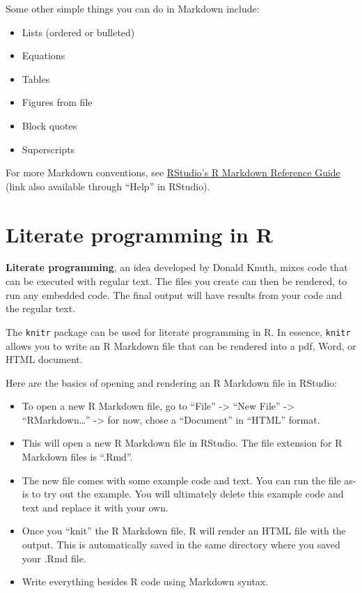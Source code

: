 \documentclass[]{book}
\providecommand{\tightlist}{%
  \setlength{\itemsep}{0pt}\setlength{\parskip}{0pt}}
\theoremstyle{definition}
\theoremstyle{definition}
\theoremstyle{definition}
\theoremstyle{remark}
\begin{document}
Some other simple things you can do in Markdown include:

\begin{itemize}
\tightlist
\item
  Lists (ordered or bulleted)
\item
  Equations
\item
  Tables
\item
  Figures from file
\item
  Block quotes
\item
  Superscripts
\end{itemize}

For more Markdown conventions, see
\href{https://www.rstudio.com/wp-content/uploads/2015/03/rmarkdown-reference.pdf}{RStudio's
R Markdown Reference Guide} (link also available through ``Help'' in
RStudio).

\section{Literate programming in R}\label{literate-programming-in-r}

\textbf{Literate programming}, an idea developed by Donald Knuth, mixes
code that can be executed with regular text. The files you create can
then be rendered, to run any embedded code. The final output will have
results from your code and the regular text.

The \texttt{knitr} package can be used for literate programming in R. In
essence, \texttt{knitr} allows you to write an R Markdown file that can
be rendered into a pdf, Word, or HTML document.

Here are the basics of opening and rendering an R Markdown file in
RStudio:

\begin{itemize}
\tightlist
\item
  To open a new R Markdown file, go to ``File'' -\textgreater{} ``New
  File'' -\textgreater{} ``RMarkdown\ldots{}'' -\textgreater{} for now,
  chose a ``Document'' in ``HTML'' format.
\item
  This will open a new R Markdown file in RStudio. The file extension
  for R Markdown files is ``.Rmd''.
\item
  The new file comes with some example code and text. You can run the
  file as-is to try out the example. You will ultimately delete this
  example code and text and replace it with your own.
\item
  Once you ``knit'' the R Markdown file, R will render an HTML file with
  the output. This is automatically saved in the same directory where
  you saved your .Rmd file.
\item
  Write everything besides R code using Markdown syntax.
\end{itemize}
\end{document}
